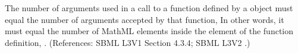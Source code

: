 The number of arguments used in a call to a function defined by a
\FunctionDefinition object must equal the number of arguments accepted by
that function,   In other words, it must equal the number of MathML
 elements inside the  element of the function
definition, .  (References: SBML L3V1 Section 4.3.4; SBML L3V2
.)

